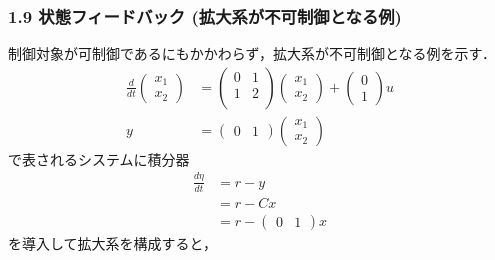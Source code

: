 \begin{frame}[t]
\frametitle{1.9 状態フィードバック (拡大系が不可制御となる例)}
制御対象が可制御であるにもかかわらず，拡大系が不可制御となる例を示す．
\begin{align}
 \frac{d}{dt}
 \left(
 \begin{array}{c}
  x_1 \\
  x_2
 \end{array}
 \right) &=
 \left(
 \begin{array}{cc}
  0 & 1 \\
  1 & 2 \\
 \end{array}
 \right)
 \left(
 \begin{array}{c}
  x_1 \\
  x_2
 \end{array}
 \right) +
 \left(
 \begin{array}{c}
  0 \\
  1
 \end{array}
 \right) u \\
 y &=
 \left(
 \begin{array}{cc}
  0 & 1
 \end{array}
 \right)
 \left(
 \begin{array}{c}
  x_1 \\
  x_2
 \end{array}
 \right)
\end{align}
で表されるシステムに積分器
\begin{align}
 \frac{d\eta}{dt} &= r - y \\
 &= r - Cx \\
 &= r - \left(\begin{array}{cc}0 & 1\end{array}\right)x
\end{align}
を導入して拡大系を構成すると，
\end{frame}


